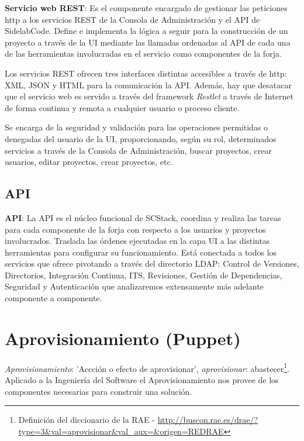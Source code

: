 \par \textbf{Servicio web REST}: Es el componente encargado de gestionar las peticiones http a los servicios REST de la Consola de Administración y el API de SidelabCode. Define e implementa la lógica a seguir para la construcción de un proyecto a través de la UI mediante las llamadas ordenadas al API de cada una de las herramientas involucradas en el servicio como componentes de la forja.

\par Los servicios REST ofrecen tres interfaces distintas accesibles a través de http: XML, JSON y HTML para la comunicación la API. Además, hay que desatacar que el servicio web es servido a través del framework \emph{Restlet} a través de Internet de forma continua y remota a cualquier usuario o proceso cliente.

\par Se encarga de la seguridad y validación para las operaciones permitidas o denegadas del usuario de la UI, proporcionando, según su rol, determinados servicios a través de la Consola de Administración, buscar proyectos, crear usuarios, editar proyectos, crear proyectos, etc.


\subsection{API}
\label{sub:api}

\par \textbf{API}: La API es el núcleo funcional de SCStack, coordina y realiza las tareas para cada componente de la forja con respecto a los usuarios y proyectos involucrados. Traslada las órdenes ejecutadas en la capa UI a las distintas herramientas para configurar su funcionamiento. Está conectada a todos los servicios que ofrece pivotando a través del directorio LDAP: Control de Versiones, Directorios, Integración Continua, ITS, Revisiones, Gestión de Dependencias, Seguridad y Autenticación que analizaremos extensamente más adelante componente a componente.



\section{Aprovisionamiento (Puppet)}
\label{sec:puppet}

\par \emph{Aprovisionamiento}: 'Accción o efecto de aprovisionar', \emph{aprovisionar}: abastecer\footnote{Definición del diccionario de la RAE - \url{http://buscon.rae.es/drae/?type=3&val=aprovisionar&val_aux=&origen=REDRAE}}. Aplicado a la Ingeniería del Software el Aprovisionamiento nos provee de los componentes necesarias para construir una solución.

